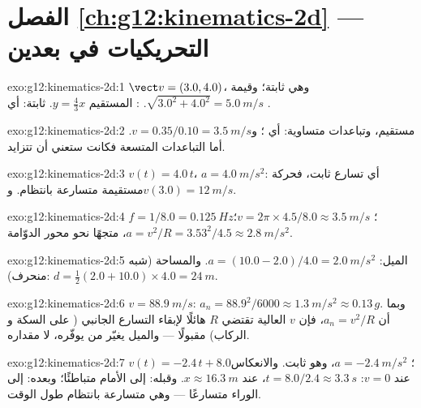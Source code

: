 \section*{الفصل \ref{ch:g12:kinematics-2d} --- التحريكيات في بعدين}

\begin{solution}{exo:g12:kinematics-2d:1}
$\vect v = (3.0, 4.0)$، وهي ثابتة؛ وقيمة  $\sqrt{3.0^2 + 4.0^2} =
\qty{5.0}{m/s}$. : المستقيم $y = \tfrac43 x$.  ثابتة: أي .
\end{solution}

\begin{solution}{exo:g12:kinematics-2d:2}
مستقيم، وتباعدات متساوية: أي ؛
و$v = 0.35/0.10 = \qty{3.5}{m/s}$. أما التباعدات المتسعة فكانت ستعني أن
 تتزايد.
\end{solution}

\begin{solution}{exo:g12:kinematics-2d:3}
$v(t) = 4.0\,t$، $a = \qty{4.0}{m/s^2}$: أي تسارع ثابت،
فحركة مستقيمة متسارعة بانتظام. و$v(3.0) = \qty{12}{m/s}$.
\end{solution}

\begin{solution}{exo:g12:kinematics-2d:4}
$f = 1/8.0 = \qty{0.125}{Hz}$؛
$v = 2\pi \times 4.5/8.0 \approx \qty{3.5}{m/s}$؛
$a = v^2/R = 3.53^2/4.5 \approx \qty{2.8}{m/s^2}$، متجهًا نحو
محور الدوّامة.
\end{solution}

\begin{solution}{exo:g12:kinematics-2d:5}
الميل: $a = (10.0 - 2.0)/4.0 = \qty{2.0}{m/s^2}$. والمساحة (شبه منحرف):
$d = \tfrac12 (2.0 + 10.0) \times 4.0 = \qty{24}{m}$.
\end{solution}

\begin{solution}{exo:g12:kinematics-2d:6}
$v = \qty{88.9}{m/s}$: $a_n = 88.9^2/6000 \approx \qty{1.3}{m/s^2}
\approx 0.13\,g$. وبما أن $a_n = v^2/R$، فإن $v$ العالية تقتضي $R$ هائلًا
لإبقاء التسارع الجانبي ( على السكة و
الركاب) مقبولًا --- والميل يغيّر من يوفّره، لا مقداره.
\end{solution}

\begin{solution}{exo:g12:kinematics-2d:7}
$v(t) = -2.4\,t + 8.0$؛ $a = \qty{-2.4}{m/s^2}$، وهو ثابت. والانعكاس
عند $v = 0$: $t = 8.0/2.4 \approx \qty{3.3}{s}$، عند
$x \approx \qty{16.3}{m}$. وقبله: إلى الأمام متباطئًا؛ وبعده: إلى الوراء
متسارعًا --- وهي متسارعة بانتظام طول الوقت.
\end{solution}

